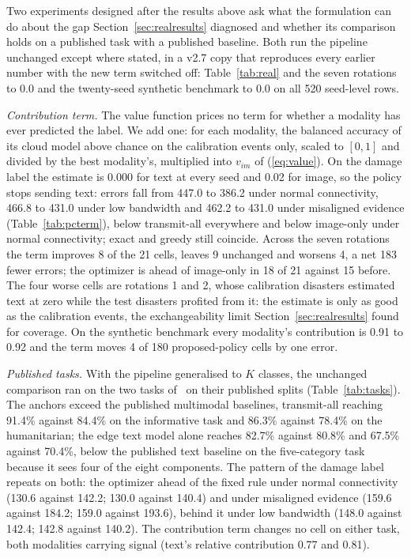 \documentclass[conference,a4paper]{IEEEtran}
\begin{document}
Two experiments designed after the results above ask what the formulation can do about the gap Section~\ref{sec:realresults} diagnosed and whether its comparison holds on a published task with a published baseline. Both run the pipeline unchanged except where stated, in a v2.7 copy that reproduces every earlier number with the new term switched off: Table~\ref{tab:real} and the seven rotations to 0.0 and the twenty-seed synthetic benchmark to 0.0 on all 520 seed-level rows.

\emph{Contribution term.} The value function prices no term for whether a modality has ever predicted the label. We add one: for each modality, the balanced accuracy of its cloud model above chance on the calibration events only, scaled to $[0,1]$ and divided by the best modality's, multiplied into $v_{im}$ of (\ref{eq:value}). On the damage label the estimate is 0.000 for text at every seed and 0.02 for image, so the policy stops sending text: errors fall from 447.0 to 386.2 under normal connectivity, 466.8 to 431.0 under low bandwidth and 462.2 to 431.0 under misaligned evidence (Table~\ref{tab:pcterm}), below transmit-all everywhere and below image-only under normal connectivity; exact and greedy still coincide. Across the seven rotations the term improves 8 of the 21 cells, leaves 9 unchanged and worsens 4, a net 183 fewer errors; the optimizer is ahead of image-only in 18 of 21 against 15 before. The four worse cells are rotations 1 and 2, whose calibration disasters estimated text at zero while the test disasters profited from it: the estimate is only as good as the calibration events, the exchangeability limit Section~\ref{sec:realresults} found for coverage. On the synthetic benchmark every modality's contribution is 0.91 to 0.92 and the term moves 4 of 180 proposed-policy cells by one error.

\emph{Published tasks.} With the pipeline generalised to $K$ classes, the unchanged comparison ran on the two tasks of~\cite{ofli2020} on their published splits (Table~\ref{tab:tasks}). The anchors exceed the published multimodal baselines, transmit-all reaching 91.4\% against 84.4\% on the informative task and 86.3\% against 78.4\% on the humanitarian; the edge text model alone reaches 82.7\% against 80.8\% and 67.5\% against 70.4\%, below the published text baseline on the five-category task because it sees four of the eight components. The pattern of the damage label repeats on both: the optimizer ahead of the fixed rule under normal connectivity (130.6 against 142.2; 130.0 against 140.4) and under misaligned evidence (159.6 against 184.2; 159.0 against 193.6), behind it under low bandwidth (148.0 against 142.4; 142.8 against 140.2). The contribution term changes no cell on either task, both modalities carrying signal (text's relative contribution 0.77 and 0.81).
\fi
\end{document}
